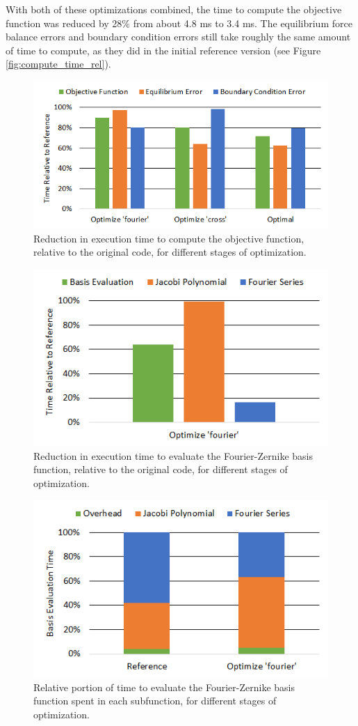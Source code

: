 \documentclass{article}
\begin{document}
With both of these optimizations combined, the time to compute the objective function was reduced by 28\% from about 4.8 ms to 3.4 ms.
The equilibrium force balance errors and boundary condition errors still take roughly the same amount of time to compute, as they did in the initial reference version (see Figure \ref{fig:compute_time_rel}).

\begin{figure}[H]
	\centering
	\includegraphics[width=0.6\linewidth,center]{./figs/compute_time_opt.png}
	\caption{Reduction in execution time to compute the objective function, relative to the original code, for different stages of optimization.}
	\label{fig:compute_time_opt}
\end{figure}
%
\begin{figure}[H]
	\centering
	\includegraphics[width=0.6\linewidth,center]{./figs/compile_time_opt.png}
	\caption{Reduction in execution time to evaluate the Fourier-Zernike basis function, relative to the original code, for different stages of optimization.}
	\label{fig:compile_time_opt}
\end{figure}
%
\begin{figure}[H]
	\centering
	\includegraphics[width=0.6\linewidth,center]{./figs/compile_time_rel.png}
	\caption{Relative portion of time to evaluate the Fourier-Zernike basis function spent in each subfunction, for different stages of optimization.}
	\label{fig:compile_time_rel}
\end{figure}
\end{document}
